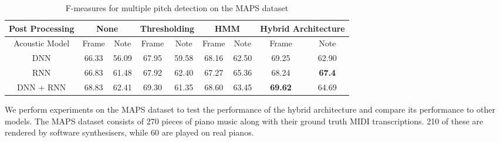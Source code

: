 \documentclass{article}
\begin{document}
\begin{table*}[htpb]
\begin{center}
  \begin{tabular}{|c| c  c | c  c | c  c | c c|}
    \hline
    Post Processing& \multicolumn{2}{|c|}{None}&\multicolumn{2}{c|}{Thresholding}&\multicolumn{2}{c|}{HMM}&\multicolumn{2}{c|}{Hybrid Architecture}\\ \hline
    Acoustic Model& Frame & Note & Frame & Note & Frame & Note & Frame & Note \\ \hline
    DNN & 66.33 & 56.09 & 67.95 &59.58 &68.16 & 62.50 & 69.25 & 62.90 \\ \hline
    RNN & 66.83 & 61.48 & 67.92 & 62.40 & 67.27 & 65.36 &68.24 & \textbf{67.4} \\ \hline
    DNN + RNN & 68.83 &62.41 &69.30 &61.35 & 68.60 & 63.45 & \textbf{69.62} &64.69 \\ \hline
  \end{tabular}%
\end{center}
\vspace{-1.8em}\caption{F-measures for multiple pitch detection on the MAPS dataset}
\end{table*}
We perform experiments on the MAPS dataset \cite{emiya2010multipitch} to test the performance of the hybrid architecture and compare its performance to other models. The MAPS dataset consists of 270 pieces of piano music along with their ground truth MIDI transcriptions. 210 of these are rendered by software synthesisers, while 60 are played on real pianos. 
\end{document}
